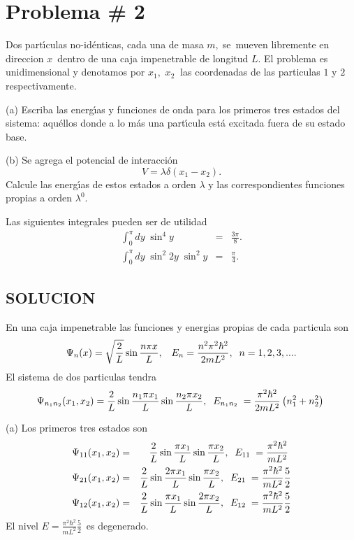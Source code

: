 
\hoffset=-1.5cm
\textwidth=17cm




\section{Problema \# 2}


Dos part\'\i culas no-id\'enticas, cada una de masa $m,\;$se\ mueven libremente 
en direccion $x$\ dentro de una caja impenetrable de longitud $L$. El
problema es unidimensional y denotamos por $x_{1},$ $x_{2}\;\;$las
coordenadas de las particulas $1$ y $2$ respectivamente.

(a) Escriba las energ\'\i as y funciones de onda  para los primeros tres estados
del sistema: aqu\'ellos donde a lo m\'as una part\'\i cula est\'a excitada fuera de su
estado base.

(b) Se agrega el potencial de interacci\'on%
\[
V=\lambda \delta (x_{1}-x_{2}).
\]
Calcule las energ\'\i as de estos estados a orden $\lambda $ y las
correspondientes funciones propias a orden $\lambda ^{0}.$

Las siguientes integrales pueden ser de utilidad%
\begin{eqnarray*}
\int_{0}^{\pi }dy\;\sin ^{4}y &=&\frac{3\pi }{8}. \\
\int_{0}^{\pi }dy\;\sin ^{2}2y\;\sin ^{2}y &=&\frac{\pi }{4}.
\end{eqnarray*}

\bigskip 

\subsection{SOLUCION}

\bigskip 

En una caja impenetrable las funciones y energias propias de cada particula
son%
\[
\Psi _{n}(x)=\sqrt{\frac{2}{L}}\sin \frac{n\pi x}{L},\;\;\;E_{n}=\frac{%
n^{2}\pi ^{2}\hbar ^{2}}{2mL^{2}},\;\;n=1,2,3,....
\]%
El sistema de dos particulas tendra%
\[
\Psi _{n_{1}n_{2}}(x_{1},x_{2})=\frac{2}{L}\sin \frac{n_{1}\pi x_{1}}{L}\sin 
\frac{n_{2}\pi x_{2}}{L},\;\;E_{n_{1}n_{2}}\;=\frac{\pi ^{2}\hbar ^{2}}{%
2mL^{2}}\left( n_{1}^{2}+n_{2}^{2}\right) \;
\]

\bigskip (a) Los primeros tres estados son%
\begin{eqnarray*}
\Psi _{11}(x_{1},x_{2}) &=&\frac{2}{L}\sin \frac{\pi x_{1}}{L}\sin \frac{\pi
x_{2}}{L},\;\;E_{11}\;=\frac{\pi ^{2}\hbar ^{2}}{mL^{2}}\; \\
\Psi _{21}(x_{1},x_{2}) &=&\frac{2}{L}\sin \frac{2\pi x_{1}}{L}\sin \frac{%
\pi x_{2}}{L},\;\;E_{21}\;=\frac{\pi ^{2}\hbar ^{2}}{mL^{2}}\frac{5}{2} \\
\Psi _{12}(x_{1},x_{2}) &=&\frac{2}{L}\sin \frac{\pi x_{1}}{L}\sin \frac{%
2\pi x_{2}}{L},\;\;E_{12}\;=\frac{\pi ^{2}\hbar ^{2}}{mL^{2}}\frac{5}{2}
\end{eqnarray*}%
El nivel $E=\frac{\pi ^{2}\hbar ^{2}}{mL^{2}}\frac{5}{2}$\ es degenerado.

